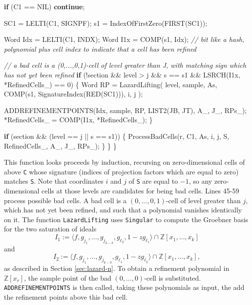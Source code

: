 \documentclass[
]{book}
\newenvironment{Shaded}{\begin{snugshade}}{\end{snugshade}}
\newcommand{\CommentTok}[1]{\textcolor[rgb]{0.56,0.35,0.01}{\textit{#1}}}
\newcommand{\ControlFlowTok}[1]{\textcolor[rgb]{0.13,0.29,0.53}{\textbf{#1}}}
\newcommand{\DecValTok}[1]{\textcolor[rgb]{0.00,0.00,0.81}{#1}}
\newcommand{\NormalTok}[1]{#1}
\theoremstyle{definition}
\theoremstyle{definition}
\theoremstyle{definition}
\theoremstyle{definition}
\theoremstyle{remark}
\begin{document}
\begin{Shaded}
\begin{Highlighting}[numbers=left,,]
        \ControlFlowTok{if}\NormalTok{ (C1 == NIL) }\ControlFlowTok{continue}\NormalTok{;}

\NormalTok{        SC1 = LELTI(C1, SIGNPF);}
\NormalTok{        s1 = IndexOfFirstZero(FIRST(SC1));}

\NormalTok{        Word Idx = LELTI(C1, INDX);}
\NormalTok{        Word I1x = COMP(s1, Idx); }\CommentTok{// bit like a hash, polynomial plus cell index to indicate that a cell has been refined}

        \CommentTok{// a bad cell is a (0,...,0,1){-}cell of level greater than J, with matching sign which has not yet been refined}
        \ControlFlowTok{if}\NormalTok{ (!section \&\& level \textgreater{} j \&\& s == s1 \&\& LSRCH(I1x, *RefinedCells\_) == }\DecValTok{0}\NormalTok{) \{}
\NormalTok{            Word RP = LazardLifting(}
\NormalTok{                level,}
\NormalTok{                sample,}
\NormalTok{                As,}
\NormalTok{                COMP(s1, SignatureIndex(RED(SC1))),}
\NormalTok{                i,}
\NormalTok{                j}
\NormalTok{            );}

\NormalTok{            ADDREFINEMENTPOINTS(Idx, sample, RP, LIST2(JB, JT), A\_, J\_, RPs\_);}
\NormalTok{            *RefinedCells\_ = COMP(I1x, *RefinedCells\_);}
\NormalTok{        \}}

        \ControlFlowTok{if}\NormalTok{ (section \&\& (level == j || s == s1)) \{}
\NormalTok{            ProcessBadCells(r, C1, As, i, j, S, RefinedCells\_, A\_, J\_, RPs\_);}
\NormalTok{        \}}
\NormalTok{    \}}
\NormalTok{\}}
\end{Highlighting}
\end{Shaded}

This function looks proceeds by induction, recursing on zero-dimensional cells of above \texttt{C} whose signature (indices of projection factors which are equal to zero) matches \texttt{S}. Note that coordinates \(i\) and \(j\) of \texttt{S} are equal to \(-1\), so any zero-dimensional cells at those levels are candidates for being bad cells. Lines 45-59 process possible bad cells. A bad cell is a \((0,...,0,1)\)-cell of level greater than \(j\), which has not yet been refined, and such that a polynomial vanishes identically on it.
The function \texttt{LazardLifting} uses \texttt{Singular} to compute the Groebner basis for the two saturation of ideals
\[
I_1 := \langle f, g_{j_1}, \ldots, g_{j_{k-3}}, g_{\ell_2}, 1 - z g_{\ell_1} \rangle \cap \mathbb{Z}[x_1,\ldots,x_k]
\]
and
\[
I_2 := \langle f, g_{j_1}, \ldots, g_{j_{k-3}}, g_{\ell_1}, 1 - z g_{\ell_2} \rangle \cap \mathbb{Z}[x_1,\ldots,x_k],
\]
as described in Section \ref{sec:lazard-n}. To obtain a refinement polynomial in \(\mathbb{Z}[x_r]\), the sample point of the bad \((0,\ldots,0)\)-cell is substituted.
\texttt{ADDREFINEMENTPOINTS} is then called, taking these polynomials as input, the add the refinement points above this bad cell.
\end{document}
